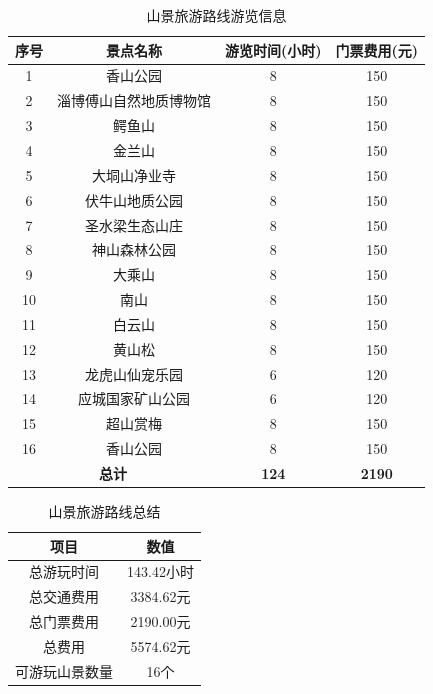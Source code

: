 \documentclass[withoutpreface,bwprint]{cumcmthesis} %
\begin{document}
\begin{table}[H]
  \centering
  \caption{山景旅游路线游览信息}
  \label{tab:山景旅游路线游览信息}
  \begin{tabular}{|c|c|c|c|}
    \hline
    \textbf{序号} & \textbf{景点名称} & \textbf{游览时间(小时)} & \textbf{门票费用(元)} \\
    \hline
    1 & 香山公园 & 8 & 150 \\
    \hline
    2 & 淄博傅山自然地质博物馆 & 8 & 150 \\
    \hline
    3 & 鳄鱼山 & 8 & 150 \\
    \hline
    4 & 金兰山 & 8 & 150 \\
    \hline
    5 & 大垌山净业寺 & 8 & 150 \\
    \hline
    6 & 伏牛山地质公园 & 8 & 150 \\
    \hline
    7 & 圣水梁生态山庄 & 8 & 150 \\
    \hline
    8 & 神山森林公园 & 8 & 150 \\
    \hline
    9 & 大乘山 & 8 & 150 \\
    \hline
    10 & 南山 & 8 & 150 \\
    \hline
    11 & 白云山 & 8 & 150 \\
    \hline
    12 & 黄山松 & 8 & 150 \\
    \hline
    13 & 龙虎山仙宠乐园 & 6 & 120 \\
    \hline
    14 & 应城国家矿山公园 & 6 & 120 \\
    \hline
    15 & 超山赏梅 & 8 & 150 \\
    \hline
    16 & 香山公园 & 8 & 150 \\
    \hline
    \multicolumn{2}{|c|}{\textbf{总计}} & \textbf{124} & \textbf{2190} \\
    \hline
  \end{tabular}
\end{table}

\begin{table}[H]
  \centering
  \caption{山景旅游路线总结}
  \label{tab:山景旅游路线总结}
  \begin{tabular}{|c|c|}
    \hline
    \textbf{项目} & \textbf{数值} \\
    \hline
    总游玩时间 & 143.42小时 \\
    \hline
    总交通费用 & 3384.62元 \\
    \hline
    总门票费用 & 2190.00元 \\
    \hline
    总费用 & 5574.62元 \\
    \hline
    可游玩山景数量 & 16个 \\
    \hline
  \end{tabular}
\end{table}
\end{document}
